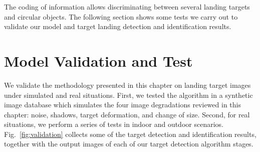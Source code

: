 
The coding of information allows discriminating between several landing targets and circular objects. The following section shows some tests we carry out to validate our model and target landing detection and identification results. 

\section{Model Validation and Test}\label{sec:validation_and_test}
We validate the methodology presented in this chapter on landing target images under simulated and real situations. First, we tested the algorithm in a synthetic image database which simulates the four image degradations reviewed in this chapter: noise, shadows, target deformation, and change of size. Second, for real situations, we perform a series of tests in indoor and outdoor scenarios. Fig.\ \ref{fig:validation} collects some of the target detection and identification results, together with the output images of each of our target detection algorithm stages. 

